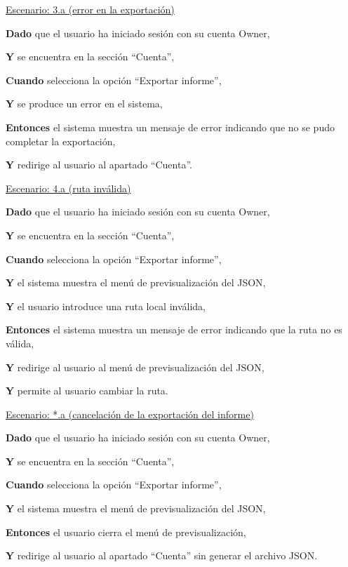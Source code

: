 \underline{Escenario: 3.a (error en la exportación)}\par
\vspace{0.15cm}
\textbf{Dado} que el usuario ha iniciado sesión con su cuenta Owner,\par
\textbf{Y} se encuentra en la sección \enquote{Cuenta},\par
\textbf{Cuando} selecciona la opción \enquote{Exportar informe},\par
\textbf{Y} se produce un error en el sistema,\par
\textbf{Entonces} el sistema muestra un mensaje de error indicando que no se pudo completar la exportación,\par
\textbf{Y} redirige al usuario al apartado \enquote{Cuenta}.\par
\vspace{0.20cm}

\underline{Escenario: 4.a (ruta inválida)}\par
\vspace{0.15cm}
\textbf{Dado} que el usuario ha iniciado sesión con su cuenta Owner,\par
\textbf{Y} se encuentra en la sección \enquote{Cuenta},\par
\textbf{Cuando} selecciona la opción \enquote{Exportar informe},\par
\textbf{Y} el sistema muestra el menú de previsualización del JSON,\par
\textbf{Y} el usuario introduce una ruta local inválida,\par
\textbf{Entonces} el sistema muestra un mensaje de error indicando que la ruta no es válida,\par
\textbf{Y} redirige al usuario al menú de previsualización del JSON,\par
\textbf{Y} permite al usuario cambiar la ruta.\par
\vspace{0.20cm}

\underline{Escenario: *.a (cancelación de la exportación del informe)}\par
\vspace{0.15cm}
\textbf{Dado} que el usuario ha iniciado sesión con su cuenta Owner,\par
\textbf{Y} se encuentra en la sección \enquote{Cuenta},\par
\textbf{Cuando} selecciona la opción \enquote{Exportar informe},\par
\textbf{Y} el sistema muestra el menú de previsualización del JSON,\par
\textbf{Entonces} el usuario cierra el menú de previsualización,\par
\textbf{Y} redirige al usuario al apartado \enquote{Cuenta} sin generar el archivo JSON.\par
\vspace{0.20cm}

